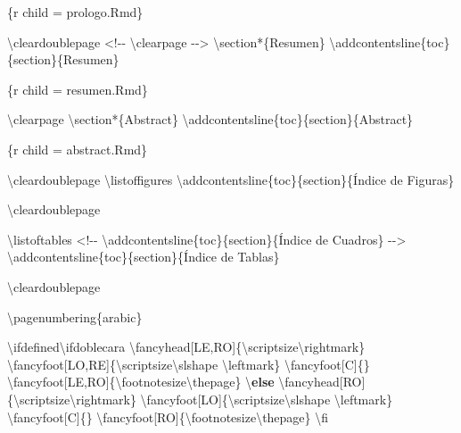 \documentclass[11pt,a4paper,oneside,]{article}
\newenvironment{Shaded}{\begin{snugshade}}{\end{snugshade}}
\newcommand{\AttributeTok}[1]{\textcolor[rgb]{0.77,0.63,0.00}{#1}}
\newcommand{\ControlFlowTok}[1]{\textcolor[rgb]{0.13,0.29,0.53}{\textbf{#1}}}
\newcommand{\NormalTok}[1]{#1}
\newcommand{\OtherTok}[1]{\textcolor[rgb]{0.56,0.35,0.01}{#1}}
\newcommand{\SpecialCharTok}[1]{\textcolor[rgb]{0.00,0.00,0.00}{#1}}
\newcommand{\StringTok}[1]{\textcolor[rgb]{0.31,0.60,0.02}{#1}}
\numberwithin{dummy}{section}
\theoremstyle{ocrenumbox}
\theoremstyle{blacknumex}
\theoremstyle{blacknumbox}
\theoremstyle{ocrenum}
\theoremstyle{ocrenum}
\begin{document}
\begin{Shaded}
\begin{Highlighting}[numbers=left,,]
\StringTok{\textasciigrave{}\textasciigrave{}\textasciigrave{}}\AttributeTok{\{r child = \textquotesingle{}prologo.Rmd\textquotesingle{}\}}
\StringTok{\textasciigrave{}\textasciigrave{}\textasciigrave{}}


\NormalTok{\textbackslash{}cleardoublepage   }
\SpecialCharTok{\textless{}!{-}{-}}\NormalTok{  \textbackslash{}clearpage }\SpecialCharTok{{-}}\OtherTok{{-}\textgreater{}}
\NormalTok{\textbackslash{}section}\SpecialCharTok{*}\NormalTok{\{Resumen\}}
\NormalTok{\textbackslash{}addcontentsline\{toc\}\{section\}\{Resumen\}}

\StringTok{\textasciigrave{}\textasciigrave{}\textasciigrave{}}\AttributeTok{\{r child = \textquotesingle{}resumen.Rmd\textquotesingle{}\}}
\StringTok{\textasciigrave{}\textasciigrave{}\textasciigrave{}}


\NormalTok{\textbackslash{}clearpage}
\NormalTok{\textbackslash{}section}\SpecialCharTok{*}\NormalTok{\{Abstract\}}
\NormalTok{\textbackslash{}addcontentsline\{toc\}\{section\}\{Abstract\}}

\StringTok{\textasciigrave{}\textasciigrave{}\textasciigrave{}}\AttributeTok{\{r child = \textquotesingle{}abstract.Rmd\textquotesingle{}\}}
\StringTok{\textasciigrave{}\textasciigrave{}\textasciigrave{}}


\NormalTok{\textbackslash{}cleardoublepage   }
\NormalTok{\textbackslash{}listoffigures}
\NormalTok{\textbackslash{}addcontentsline\{toc\}\{section\}\{Índice de Figuras\}}

\NormalTok{\textbackslash{}cleardoublepage   }

\NormalTok{\textbackslash{}listoftables}
\SpecialCharTok{\textless{}!{-}{-}}\NormalTok{ \textbackslash{}addcontentsline\{toc\}\{section\}\{Índice de Cuadros\} }\SpecialCharTok{{-}}\OtherTok{{-}\textgreater{}}
\NormalTok{\textbackslash{}addcontentsline\{toc\}\{section\}\{Índice de Tablas\}}

\NormalTok{\textbackslash{}cleardoublepage   }

\NormalTok{\textbackslash{}pagenumbering\{arabic\}}

\NormalTok{\textbackslash{}ifdefined\textbackslash{}ifdoblecara}
\NormalTok{\textbackslash{}fancyhead[LE,RO]\{\textbackslash{}scriptsize\textbackslash{}rightmark\}}
\NormalTok{\textbackslash{}fancyfoot[LO,RE]\{\textbackslash{}scriptsize\textbackslash{}slshape \textbackslash{}leftmark\}}
\NormalTok{\textbackslash{}fancyfoot[C]\{\}}
\NormalTok{\textbackslash{}fancyfoot[LE,RO]\{\textbackslash{}footnotesize\textbackslash{}thepage\}}
\NormalTok{\textbackslash{}}\ControlFlowTok{else}
\NormalTok{\textbackslash{}fancyhead[RO]\{\textbackslash{}scriptsize\textbackslash{}rightmark\}}
\NormalTok{\textbackslash{}fancyfoot[LO]\{\textbackslash{}scriptsize\textbackslash{}slshape \textbackslash{}leftmark\}}
\NormalTok{\textbackslash{}fancyfoot[C]\{\}}
\NormalTok{\textbackslash{}fancyfoot[RO]\{\textbackslash{}footnotesize\textbackslash{}thepage\}}
\NormalTok{\textbackslash{}fi}


\end{Highlighting}
\end{Shaded}
\end{document}
